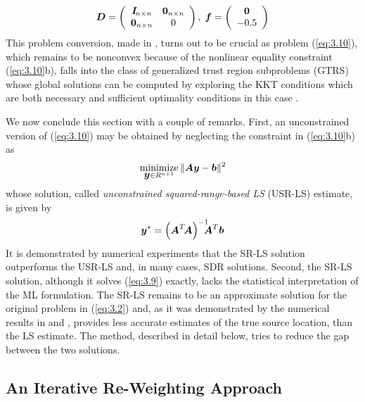 \begin{equation}%
\nonumber
\BD=\left(\begin{array}{cc}
    \BI\!_{n\times n} & \BO_{n\times n} \\
    \BO_{n\times n} & 0
    \end{array} \right), \;
\Bf=\left(\begin{array}{c}\BO \\ -0.5 \end{array} \right)
\end{equation}
This problem conversion, made in \cite{BeckStLi}, turns out to be crucial as problem (\ref{eq:3.10}), which remains to be nonconvex because of the nonlinear equality constraint (\ref{eq:3.10}b), falls into the class of generalized trust region subproblems (GTRS) \cite{FortinWol, More}  whose global solutions can be computed by exploring the KKT conditions which are both necessary and sufficient optimality conditions in this case \cite{More}.

We now conclude this section with a couple of remarks. First, an unconstrained version of (\ref{eq:3.10}) may be obtained by neglecting the constraint in (\ref{eq:3.10}b) as
\begin{equation} \label{eq:3.12}%
\Min_{{\By} \in R^{n+1}} \|\BA\By-\Bb\|^2
\end{equation}
whose solution, called \textit{unconstrained squared-range-based LS }(USR-LS) estimate, is given by
\begin{equation} \label{eq:3.13}%
\By^*=\left(\BA^T\!\BA\right)^{-1}\!\!\!\!\BA^T\Bb
\end{equation}
It is demonstrated by numerical experiments \cite{BeckStLi} that the SR-LS solution outperforms the USR-LS and, in many cases, SDR solutions. Second, the SR-LS solution, although it solves (\ref{eq:3.9}) exactly, lacks the statistical interpretation of the ML formulation. The SR-LS remains to be an approximate solution for the original problem in (\ref{eq:3.2}) and, as it was demonstrated by the numerical results in  \cite{BeckGPS} and \cite{BeckTeCh}, provides less accurate estimates of the true source location, than the LS estimate. The method, described in detail below, tries to reduce the gap between the two solutions.

\subsection{An Iterative Re-Weighting Approach}%

